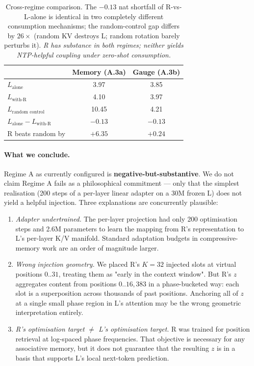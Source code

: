 \documentclass[10pt, twocolumn, a4paper]{article}
\begin{document}
\begin{table}[h]
\centering\small
\begin{tabular}{@{}lcc@{}}
\toprule
& \textbf{Memory (A.3a)} & \textbf{Gauge (A.3b)} \\
\midrule
$L_{\text{alone}}$                  & 3.97  & 3.85 \\
$L_{\text{with-R}}$                & 4.10  & 3.97 \\
$L_{\text{random control}}$         & 10.45 & 4.21 \\
$L_{\text{alone}} - L_{\text{with-R}}$    & $-0.13$ & $-0.13$ \\
R beats random by                   & $+6.35$ & $+0.24$ \\
\bottomrule
\end{tabular}
\caption{Cross-regime comparison. The $-0.13$ nat shortfall of R-vs-L-alone is identical in two completely different consumption mechanisms; the random-control gap differs by $26\times$ (random KV destroys L; random rotation barely perturbs it). \emph{R has substance in both regimes; neither yields NTP-helpful coupling under zero-shot consumption.}}
\label{tab:cross_regime}
\end{table}

\paragraph{What we conclude.} Regime A as currently configured is
\textbf{negative-but-substantive}. We do not claim Regime A fails as a
philosophical commitment --- only that the simplest realisation (200
steps of a per-layer linear adapter on a 30M frozen L) does not yield a
helpful injection. Three explanations are concurrently plausible:

\begin{enumerate}[nosep,leftmargin=1.5em]
\item \emph{Adapter undertrained.} The per-layer projection had only 200
optimisation steps and 2.6M parameters to learn the mapping from R's
representation to L's per-layer K/V manifold. Standard adaptation
budgets in compressive-memory work are an order of magnitude larger.
\item \emph{Wrong injection geometry.} We placed R's $K=32$ injected
slots at virtual positions $0..31$, treating them as "early in the
context window". But R's $z$ aggregates content from positions
$0..16{,}383$ in a phase-bucketed way: each slot is a superposition
across thousands of past positions. Anchoring all of $z$ at a single
small phase region in L's attention may be the wrong geometric
interpretation entirely.
\item \emph{R's optimisation target $\neq$ L's optimisation target.}
R was trained for position retrieval at log-spaced phase frequencies.
That objective is necessary for any associative memory, but it does not
guarantee that the resulting $z$ is in a basis that supports L's local
next-token prediction.
\end{enumerate}
\end{document}
